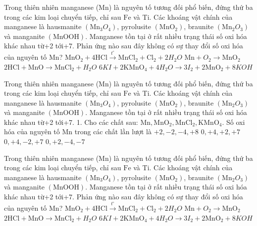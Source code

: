 \begin{ex}Trong thiên nhiên manganese (Mn) là nguyên tố tương đối phổ biến, đứng thứ ba trong các kim loại chuyển tiếp, chỉ sau $\mathrm{Fe}$ và Ti. Các khoáng vật chính của manganese là hausmanite $\left(\mathrm{Mn}_3O_4\right)$, pyrolusite $\left(\mathrm{MnO}_2\right)$, braunite $\left(\mathrm{Mn}_2O_3\right)$ và manganite $(\mathrm{MnOOH})$. Manganese tồn tại ở rất nhiều trạng thái số oxi hóa khác nhau từ+2 tới+7.
	Phản ứng nào sau đây không có sự thay đổi số oxi hóa của nguyên tố $\mathrm{Mn}$?
	\choice
	{\True $\mathrm{MnO}_2+4 \mathrm{HCl} \xrightarrow{t^{\circ}} \mathrm{MnCl}_2+\mathrm{Cl}_2+2 H_2O$}
	{$\mathrm{Mn}+O_2\to \mathrm{MnO}_2$}
	{$2 \mathrm{HCl}+\mathrm{MnO} \to \mathrm{MnCl}_2+H_2O$}
	{$6 KI+2 \mathrm{KMnO}_4+4 H_2O \to 3 I_2+2 \mathrm{MnO}_2+8 KOH$}
	\loigiai{}
\end{ex}
\begin{ex}
	Trong thiên nhiên manganese (Mn) là nguyên tố tương đối phổ biến, đứng thứ ba trong các kim loại chuyển tiếp, chỉ sau $\mathrm{Fe}$ và Ti. Các khoáng vật chính của manganese là hausmanite $\left(\mathrm{Mn}_3O_4\right)$, pyrolusite $\left(\mathrm{MnO}_2\right)$, braunite $\left(\mathrm{Mn}_2O_3\right)$ và manganite $(\mathrm{MnOOH})$. Manganese tồn tại ở rất nhiều trạng thái số oxi hóa khác nhau từ+2 tới+7.
	1. Cho các chất sau: $\mathrm{Mn}, \mathrm{MnO}_2, \mathrm{MnCl}_2, \mathrm{KMnO}_4$. Số oxi hóa của nguyên tố $\mathrm{Mn}$ trong các chất lần lượt là
	\choice
	{$+2,-2,-4,+8$}
	{\True $0,+4,+2,+7$}
	{$0,+4,-2,+7$}
	{$0,+2,-4,-7$}
	\loigiai{}
\end{ex}
\begin{ex}
	Trong thiên nhiên manganese (Mn) là nguyên tố tương đối phổ biến, đứng thứ ba trong các kim loại chuyển tiếp, chỉ sau $\mathrm{Fe}$ và Ti. Các khoáng vật chính của manganese là hausmanite $\left(\mathrm{Mn}_3O_4\right)$, pyrolusite $\left(\mathrm{MnO}_2\right)$, braunite $\left(\mathrm{Mn}_2O_3\right)$ và manganite $(\mathrm{MnOOH})$. Manganese tồn tại ở rất nhiều trạng thái số oxi hóa khác nhau từ+2 tới+7.
	Phản ứng nào sau đây không có sự thay đổi số oxi hóa của nguyên tố $\mathrm{Mn}$?
	\choice
	{$\mathrm{MnO}_2+4 \mathrm{HCl} \xrightarrow{t^{\circ}} \mathrm{MnCl}_2+\mathrm{Cl}_2+2 H_2O$}
	{$\mathrm{Mn}+O_2\to \mathrm{MnO}_2$}
	{\True $2 \mathrm{HCl}+\mathrm{MnO} \to \mathrm{MnCl}_2+H_2O$}
	{$6 KI+2 \mathrm{KMnO}_4+4 H_2O \to 3 I_2+2 \mathrm{MnO}_2+8 KOH$}
	\loigiai{}
\end{ex}

